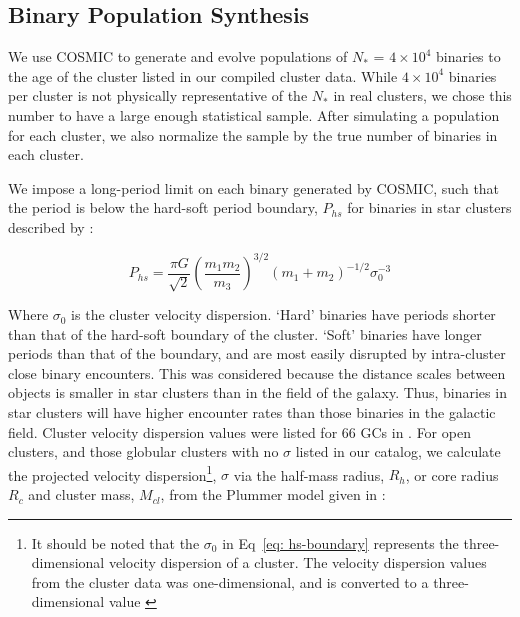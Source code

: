 \documentclass[twocolumn]{aastex63}
\begin{document}
\subsection{Binary Population Synthesis} \label{subsec:cosmic}
We use COSMIC \citep{2018PhDT........74B} to generate and evolve populations of $N_{*}$ = $4 \times 10^4$ binaries to the age of the cluster listed in our compiled cluster data. While $4 \times 10^4$ binaries per cluster is not physically representative of the $N_{*}$ in real clusters, we chose this number to have a large enough statistical sample. After simulating a population for each cluster, we also normalize the sample by the true number of binaries in  each cluster. 

We impose a long-period limit on each binary generated by COSMIC, such that the period is below the hard-soft period boundary, \textit{$P_{hs}$} for binaries in star clusters described by \citet{2015ApJ...808L..25G}:

\begin{equation} \label{eq: hs-boundary}
    P_{hs} = \frac{\pi G}{\sqrt{2}} \left( \frac{m_1m_2}{m_3} \right) ^{3/2}(m_1 + m_2)^{-1/2}\sigma_0^{-3}
\end{equation}

Where $\sigma_0$ is the cluster velocity dispersion. ‘Hard’ binaries have periods shorter than that of the hard-soft boundary of the cluster. ‘Soft’ binaries have longer periods than that of the boundary, and are most easily disrupted by intra-cluster close binary encounters. This was considered because the distance scales between objects is smaller in star clusters than in the field of the galaxy. Thus, binaries in star clusters will have higher encounter rates than those binaries in the galactic field. Cluster velocity dispersion values were listed for 66 GCs in \citet{1996AJ....112.1487H}. For open clusters, and those globular clusters with no $\sigma$ listed in our catalog, we calculate the projected velocity dispersion\footnote{It should be noted that the $\sigma_0$ in Eq~\ref{eq: hs-boundary} represents the three-dimensional velocity dispersion of a cluster. The velocity dispersion values from the cluster data was one-dimensional, and is converted to a three-dimensional value \citep{2015ApJ...808L..25G}}, $\sigma$  via the half-mass radius, $R_h$, or core radius $R_c$ and cluster mass, $M_{cl}$, from the Plummer model given in \cite{1911MNRAS..71..460P}:
\end{document}
